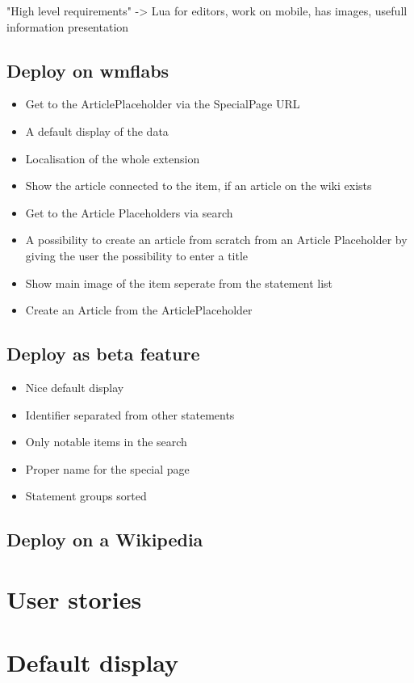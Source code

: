 \documentclass[11pt]{article}
\begin{document}
"High level requirements" -> Lua for editors, work on mobile, has images, usefull information presentation

\subsection[wmflabs]{Deploy on wmflabs}
\begin{itemize}
\item Get to the ArticlePlaceholder via the SpecialPage URL
\item A default display of the data
\item Localisation of the whole extension
\item Show the article connected to the item, if an article on the wiki exists
\item Get to the Article Placeholders via search
\item A possibility to create an article from scratch from an Article Placeholder by giving the user the possibility to enter a title
\item Show main image of the item seperate from the statement list
\item Create an Article from the ArticlePlaceholder
\end{itemize}

\subsection[betafeature]{Deploy as beta feature}
\begin{itemize}
\item Nice default display
\item Identifier separated from other statements
\item Only notable items in the search
\item Proper name for the special page
\item Statement groups sorted
\end{itemize}

\subsection[deploy]{Deploy on a Wikipedia}

\section{User stories}

\section {Default display}
\end{document}
